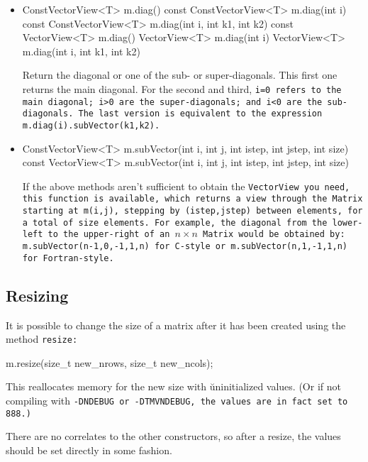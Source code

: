 \begin{itemize}
\item
\begin{tmvcode}
ConstVectorView<T> m.diag() const
ConstVectorView<T> m.diag(int i) const 
ConstVectorView<T> m.diag(int i, int k1, int k2) const
VectorView<T> m.diag()
VectorView<T> m.diag(int i)
VectorView<T> m.diag(int i, int k1, int k2)
\end{tmvcode}
Return the diagonal or one of the sub- or super-diagonals.
This first one returns the main diagonal.  For the second and third,
\tt{i=0} refers to the main diagonal; \tt{i>0} are the super-diagonals;
and \tt{i<0} are the sub-diagonals.  The last version is equivalent to the
expression 
\tt{m.diag(i).subVector(k1,k2)}.
\item
\begin{tmvcode}
ConstVectorView<T> m.subVector(int i, int j, int istep, int jstep, 
      int size) const
VectorView<T> m.subVector(int i, int j, int istep, int jstep, int size) 
\end{tmvcode}
If the above methods aren't sufficient to obtain the \tt{VectorView} you
need, this function is available, which returns a view through the \tt{Matrix} 
starting at \tt{m(i,j)}, stepping by \tt{(istep,jstep)} between elements,
for a total of \tt{size} elements.  For example, the diagonal
from the lower-left to the upper-right of an $n \times n$ \tt{Matrix} 
would be obtained by: \tt{m.subVector(n-1,0,-1,1,n)} for C-style or
\tt{m.subVector(n,1,-1,1,n)} for Fortran-style.

\end{itemize}

\subsection{Resizing}
\label{Matrix_Resize}

It is possible to change the size of a matrix after it has been created using the method \tt{resize}:

\begin{tmvcode}
m.resize(size_t new_nrows, size_t new_ncols);
\end{tmvcode}

This reallocates memory for the new size with {\u uninitialized} values.  
(Or if not compiling with \tt{-DNDEBUG} or \tt{-DTMVNDEBUG}, the values are in fact set to 888.)

There are no correlates to the other constructors, so after a resize, the 
values should be set directly in some fashion.

